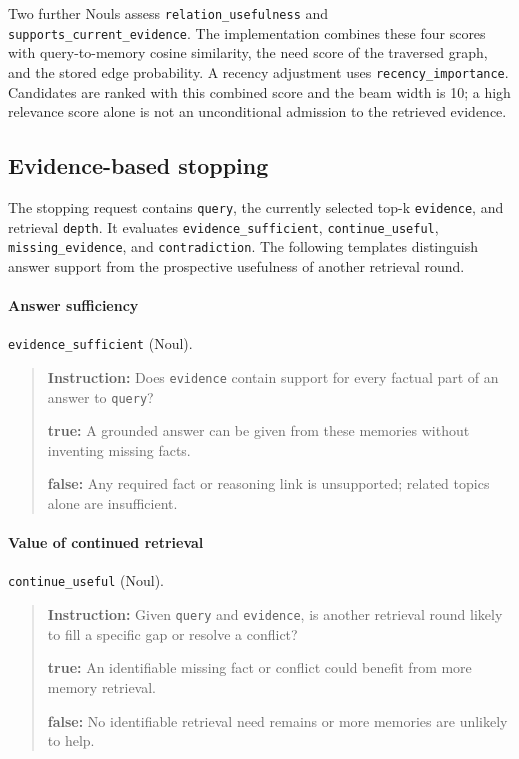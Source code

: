\documentclass[11pt]{article}
\begin{document}
Two further Nouls assess \texttt{relation\_usefulness} and \texttt{supports\_current\_evidence}. The implementation combines these four scores with query-to-memory cosine similarity, the need score of the traversed graph, and the stored edge probability. A recency adjustment uses \texttt{recency\_importance}. Candidates are ranked with this combined score and the beam width is 10; a high relevance score alone is not an unconditional admission to the retrieved evidence.

\subsection{Evidence-based stopping}

The stopping request contains \texttt{query}, the currently selected top-k \texttt{evidence}, and retrieval \texttt{depth}. It evaluates \texttt{evidence\_sufficient}, \texttt{continue\_useful}, \texttt{missing\_evidence}, and \texttt{contradiction}. The following templates distinguish answer support from the prospective usefulness of another retrieval round.

\paragraph{Answer sufficiency} \texttt{evidence\_sufficient} (Noul).
\begin{quote}\small
\noindent\textbf{Instruction:} Does \texttt{evidence} contain support for every factual part of an answer to \texttt{query}?\par
\noindent\textbf{true:} A grounded answer can be given from these memories without inventing missing facts.\par
\noindent\textbf{false:} Any required fact or reasoning link is unsupported; related topics alone are insufficient.\par
\end{quote}

\paragraph{Value of continued retrieval} \texttt{continue\_useful} (Noul).
\begin{quote}\small
\noindent\textbf{Instruction:} Given \texttt{query} and \texttt{evidence}, is another retrieval round likely to fill a specific gap or resolve a conflict?\par
\noindent\textbf{true:} An identifiable missing fact or conflict could benefit from more memory retrieval.\par
\noindent\textbf{false:} No identifiable retrieval need remains or more memories are unlikely to help.\par
\end{quote}
\end{document}

